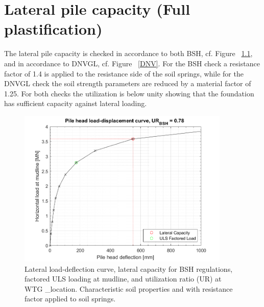 \chapter{Lateral pile capacity (Full plastification)}\label{sec_7}

The lateral pile capacity is checked in accordance to both BSH, cf. Figure ~\ref{BSH}, and in accordance to DNVGL, cf. Figure ~\ref{DNV}. For the BSH check a resistance factor of 1.4 is applied to the resistance side of the soil springs, while for the DNVGL check the soil strength parameters are reduced by a material factor of 1.25. For both checks the utilization is below unity showing that the foundation has sufficient capacity against lateral loading.

\begin{figure}[!htbp]
\includegraphics[width=0.9\textwidth]{AppendixGenerationFiles/ProjectLocation/utilization_ratio_BSH.png}
\caption{Lateral load-deflection curve, lateral capacity for BSH regulations, factored ULS loading at mudline, and utilization ratio (UR) at WTG {\ID_location}. Characteristic soil properties and with resistance factor applied to soil springs.}
\label{BSH}\end{figure}


